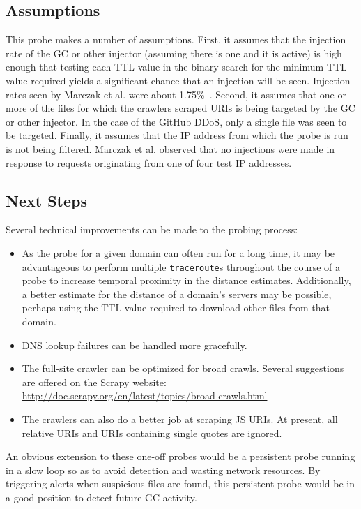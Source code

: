 \subsection{Assumptions}
This probe makes a number of assumptions.
First, it assumes that the injection rate of the GC or other injector (assuming there is one and it is active) is high enough that testing each TTL value in the binary search for the minimum TTL value required yields a significant chance that an injection will be seen.
Injection rates seen by Marczak et al. were about 1.75\%~\cite{Marczak2015}.
Second, it assumes that one or more of the files for which the crawlers scraped URIs is being targeted by the GC or other injector.
In the case of the GitHub DDoS, only a single file was seen to be targeted.
Finally, it assumes that the IP address from which the probe is run is not being filtered.
Marczak et al. observed that no injections were made in response to requests originating from one of four test IP addresses.
\subsection{Next Steps}
Several technical improvements can be made to the probing process:
\begin{itemize}\addtolength{\itemsep}{-.35\baselineskip}
	\item As the probe for a given domain can often run for a long time, it may be advantageous to perform multiple \texttt{traceroute}s throughout the course of a probe to increase temporal proximity in the distance estimates.
		Additionally, a better estimate for the distance of a domain's servers may be possible, perhaps using the TTL value required to download other files from that domain.
	\item DNS lookup failures can be handled more gracefully.
	\item The full-site crawler can be optimized for broad crawls.
		Several suggestions are offered on the Scrapy website: \url{http://doc.scrapy.org/en/latest/topics/broad-crawls.html}
	\item The crawlers can also do a better job at scraping JS URIs.
		At present, all relative URIs and URIs containing single quotes are ignored.
\end{itemize}

An obvious extension to these one-off probes would be a persistent probe running in a slow loop so as to avoid detection and wasting network resources.
By triggering alerts when suspicious files are found, this persistent probe would be in a good position to detect future GC activity.